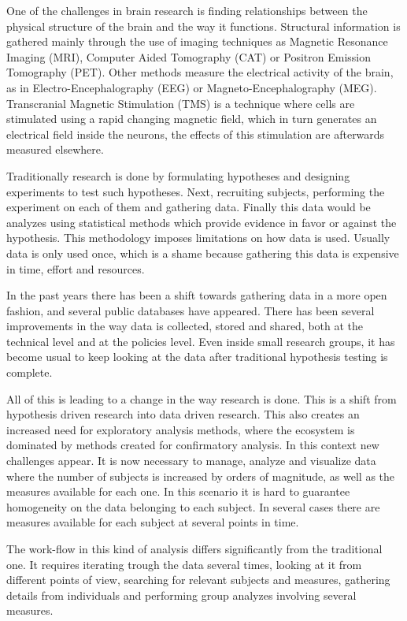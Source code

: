 

One of the challenges in brain research is finding relationships between the physical structure of the brain and the way it functions. Structural information is gathered mainly through the use of imaging techniques as Magnetic Resonance Imaging (MRI), Computer Aided Tomography (CAT) or Positron Emission Tomography (PET). Other methods measure the electrical activity of the brain, as in Electro-Encephalography  (EEG) or Magneto-Encephalography (MEG). Transcranial Magnetic Stimulation (TMS) is a technique where cells are stimulated using a rapid changing magnetic field, which in turn generates an electrical field inside the neurons, the effects of this stimulation are afterwards measured elsewhere. 

Traditionally research is done by formulating hypotheses and designing experiments to test such hypotheses. Next, recruiting subjects, performing the experiment on each of them and gathering data. Finally this data would be analyzes using statistical methods which provide evidence in favor or against the hypothesis. This methodology imposes limitations on how data is used. Usually data is only used once, which is a shame because gathering this data is expensive in time, effort and resources. 

In the past years there has been a shift towards gathering data in a more open fashion, and several public databases have appeared. There has been several improvements in the way data is collected, stored and shared, both at the technical level and at the policies level. Even inside small research groups, it has become usual to keep looking at the data after traditional hypothesis testing is complete. 

All of this is leading to a change in the way research is done. This is a shift from hypothesis driven research into data driven research. This also creates an increased need for exploratory analysis methods, where the ecosystem is dominated by methods created for confirmatory analysis. In this context new challenges appear. It is now necessary to manage, analyze and visualize data where the number of subjects is increased by orders of magnitude, as well as the measures available for each one. In this scenario it is hard to guarantee homogeneity on the data belonging to each subject. In several cases there are measures available for each subject at several points in time. 

The work-flow in this kind of analysis differs significantly from the traditional one. It requires iterating trough the data several times, looking at it from different points of view, searching for relevant subjects and measures, gathering details from individuals and performing group analyzes involving several measures. 

